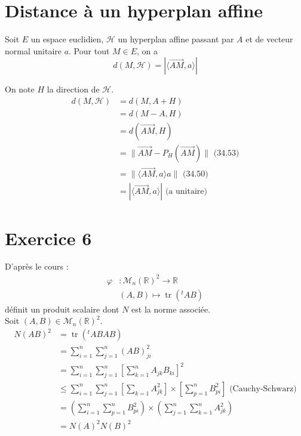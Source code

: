 \documentclass[../main.tex]{subfiles}
\begin{document}
\section{Distance à un hyperplan affine}
\begin{tcolorbox}[title=Théorème 34.54, title filled=false, colframe=orange, colback=orange!10!white]
    Soit $E$ un espace euclidien, $\mathcal{H}$ un hyperplan affine passant par $A$ et de vecteur normal unitaire $a$. Pour tout $M \in E$, on a
    $$d(M, \mathcal{H})=|\langle\overrightarrow{A M}, a\rangle|$$
\end{tcolorbox}

\noindent On note $H$ la direction de $\mathcal{H}$. 
\begin{align*}
    d(M, \mathcal{H}) &= d(M, A + H) \\
    &= d(M - A, H) \\
    &= d(\vec{AM}, H) \\
    &= \|\vec{AM} - P_H(\vec{AM})\| \text{ (34.53)} \\
    &= \|\langle \vec{AM}, a\rangle a\| \text{ (34.50)} \\
    &= |\langle \vec{AM}, a\rangle| \text{ (a unitaire)}
\end{align*}

\section*{Exercice 6}
\noindent D'après le cours : 
\begin{align*}
    \varphi&:\mathcal{M}_n(\mathbb{R})^2\to \mathbb{R} \\
    &(A, B)\mapsto \operatorname{tr}({^tAB})
\end{align*}
définit un produit scalaire dont $N$ est la norme associée. \\
Soit $(A, B)\in \mathcal{M}_n(\mathbb{R})^2$. 
\begin{align*}
    N(AB)^2 &= \operatorname{tr}({^tAB}AB) \\
    &= \sum_{i=1}^{n} \sum_{j=1}^{n} (AB)_{ji}^2 \\
    &= \sum_{i=1}^{n} \sum_{j=1}^{n} \left[ \sum_{k=1}^{n} A_{jk} B_{ki} \right]^2 \\
    &\leq \sum_{i=1}^{n} \sum_{j=1}^{n} \left[ \sum_{k=1}^{} A_{jk}^2 \right]\times \left[ \sum_{p=1}^{n} B_{pi}^2 \right] \text{ (Cauchy-Schwarz)} \\
    &= \left( \sum_{i=1}^{n} \sum_{p=1}^{n} B_{pi}^2 \right) \times \left( \sum_{j=1}^{n} \sum_{k=1}^{n} A_{jk}^2 \right) \\
    &= N(A)^2N(B)^2
\end{align*}
\end{document}
